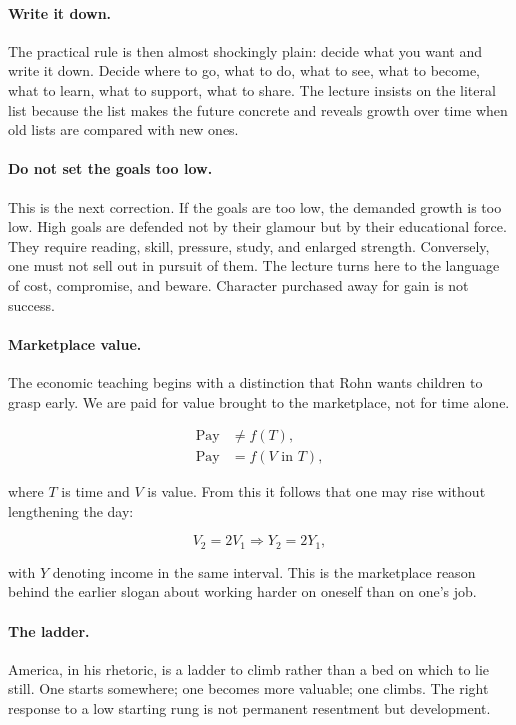 \paragraph{Write it down.}
The practical rule is then almost shockingly plain: decide what you want and write it down. Decide where to go, what to do, what to see, what to become, what to learn, what to support, what to share. The lecture insists on the literal list because the list makes the future concrete and reveals growth over time when old lists are compared with new ones.

\paragraph{Do not set the goals too low.}
This is the next correction. If the goals are too low, the demanded growth is too low. High goals are defended not by their glamour but by their educational force. They require reading, skill, pressure, study, and enlarged strength. Conversely, one must not sell out in pursuit of them. The lecture turns here to the language of cost, compromise, and beware. Character purchased away for gain is not success.

\paragraph{Marketplace value.}
The economic teaching begins with a distinction that Rohn wants children to grasp early. We are paid for value brought to the marketplace, not for time alone.

\begin{align}
\text{Pay} &\neq f(T), \\
\text{Pay} &= f(V\text{ in }T),
\end{align}

where \(T\) is time and \(V\) is value. From this it follows that one may rise without lengthening the day:

\begin{equation}
V_2=2V_1 \Rightarrow Y_2=2Y_1,
\end{equation}

with \(Y\) denoting income in the same interval. This is the marketplace reason behind the earlier slogan about working harder on oneself than on one's job.

\paragraph{The ladder.}
America, in his rhetoric, is a ladder to climb rather than a bed on which to lie still. One starts somewhere; one becomes more valuable; one climbs. The right response to a low starting rung is not permanent resentment but development.

